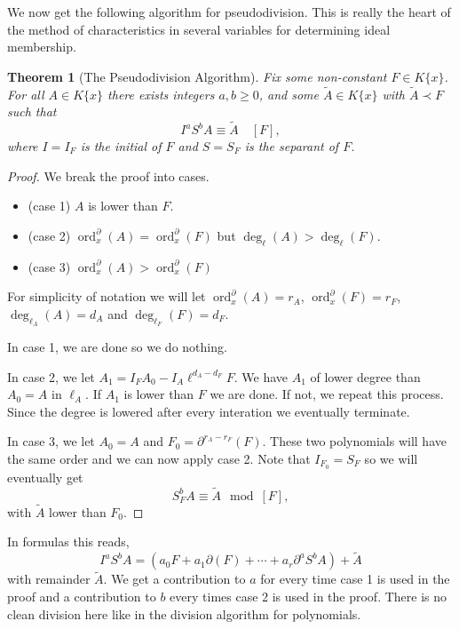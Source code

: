 \documentclass[12pt]{book}
\numberwithin{equation}{section}
\newtheorem{theorem}{Theorem}[subsection]
\theoremstyle{definition}
\theoremstyle{remark}
\newcommand{\ord}{\operatorname{ord}}
\begin{document}
We now get the following algorithm for pseudodivision. 
This is really the heart of the method of characteristics in several variables for determining ideal membership. 

\begin{theorem}[The Pseudodivision Algorithm]\label{T:ode-pseudodivision}
	Fix some non-constant $F \in K\lbrace x \rbrace$. 
	For all $A \in K\lbrace x \rbrace$ there exists integers $a,b\geq 0$, and some $\widetilde{A}\in K\lbrace x \rbrace$ with $\widetilde{A} \prec F$ such that 
	 $$ I^a S^b A \equiv \widetilde{A} \quad [F],$$
	where $I=I_F$ is the initial of $F$ and $S=S_F$ is the separant of $F$.
\end{theorem}
\begin{proof}
	We break the proof into cases. 
	\begin{itemize}
		\item (case 1) $A$ is lower than $F$. 
		\item (case 2) $\ord^{\partial}_x(A) = \ord^{\partial}_x(F)$ but $\deg_{\ell}(A) > \deg_{\ell}(F)$.
		\item (case 3) $\ord^{\partial}_x(A)>\ord^{\partial}_x(F)$
	\end{itemize}
    For simplicity of notation we will let $\ord^{\partial}_x(A) = r_A$, $\ord^{\partial}_x(F) = r_F$, $\deg_{\ell_A}(A)=d_A$ and $\deg_{\ell_F}(F)=d_F$.
    
    In case 1, we are done so we do nothing. 
    
    In case 2, we let $A_1= I_FA_0 - I_A\ell^{d_A-d_F}F$.
    We have $A_1$ of lower degree than $A_0=A$ in $\ell_A$. 
    If $A_1$ is lower than $F$ we are done. 
    If not, we repeat this process.
    Since the degree is lowered after every interation we eventually terminate. 
    
    In case 3, we let $A_0 = A$ and $F_0=\partial^{r_A-r_F}(F)$.
    These two polynomials will have the same order and we can now apply case 2. 
    Note that $I_{F_0} = S_F$ so we will eventually get 
     $$ S_F^b A \equiv \widetilde{A} \mod [F],$$
    with $\widetilde{A}$ lower than $F_0$. 
\end{proof}

In formulas this reads,
$$ I^a S^b A = (a_0F + a_1 \partial(F) + \cdots + a_r \partial^aS^b A) + \widetilde{A}$$ 
with remainder $\widetilde{A}$. 
We get a contribution to $a$ for every time case 1 is used in the proof and a contribution to $b$ every times case 2 is used in the proof. 
There is no clean division here like in the division algorithm for polynomials. 
\end{document}
